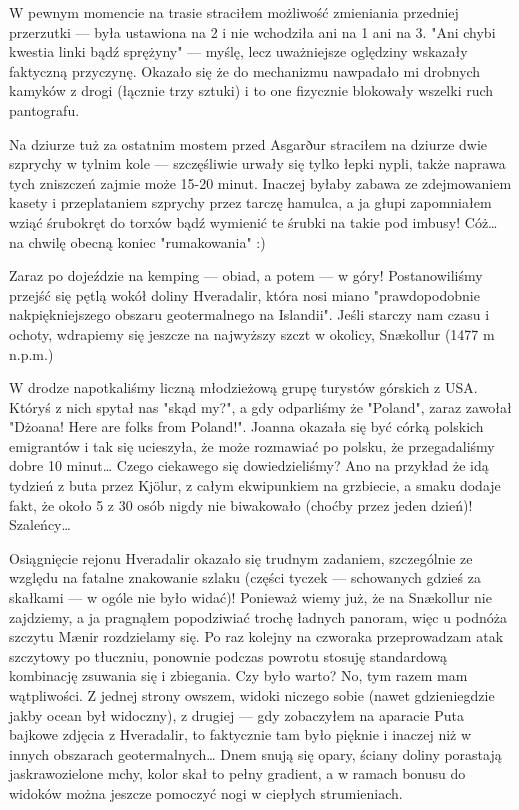W pewnym momencie na trasie straciłem możliwość zmieniania przedniej przerzutki --- była ustawiona na 2 i nie wchodziła ani na 1 ani na 3. "Ani chybi kwestia linki bądź sprężyny" --- myślę, lecz uważniejsze oględziny wskazały faktyczną przyczynę. Okazało się że do mechanizmu nawpadało mi drobnych kamyków z drogi (łącznie trzy sztuki) i to one fizycznie blokowały wszelki ruch pantografu.

Na dziurze tuż za ostatnim mostem przed Asgarður straciłem na dziurze dwie szprychy w tylnim kole --- szczęśliwie urwały się tylko łepki nypli, także naprawa tych zniszczeń zajmie może 15-20 minut. Inaczej byłaby zabawa ze zdejmowaniem kasety i przeplataniem szprychy przez tarczę hamulca, a ja głupi zapomniałem wziąć śrubokręt do torxów bądź wymienić te śrubki na takie pod imbusy! Cóż… na chwilę obecną koniec "rumakowania" :)


Zaraz po dojeździe na kemping --- obiad, a potem --- w góry! Postanowiliśmy przejść się pętlą wokół doliny Hveradalir, która nosi miano "prawdopodobnie nakpiękniejszego obszaru geotermalnego na Islandii". Jeśli starczy nam czasu i ochoty, wdrapiemy się jeszcze na najwyższy szczt w okolicy, Snækollur (1477 m n.p.m.)

W drodze napotkaliśmy liczną młodzieżową grupę turystów górskich z USA. Któryś z nich spytał nas "skąd my?", a gdy odparliśmy że "Poland", zaraz zawołał "Dżoana! Here are folks from Poland!". Joanna okazała się być córką polskich emigrantów i tak się ucieszyła, że może rozmawiać po polsku, że przegadaliśmy dobre 10 minut… Czego ciekawego się dowiedzieliśmy? Ano na przykład że idą tydzień z buta przez Kjölur, z całym ekwipunkiem na grzbiecie, a smaku dodaje fakt, że około 5 z 30 osób nigdy nie biwakowało (choćby przez jeden dzień)! Szaleńcy…


Osiągnięcie rejonu Hveradalir okazało się trudnym zadaniem, szczególnie ze względu na fatalne znakowanie szlaku (części tyczek --- schowanych gdzieś za skałkami --- w ogóle nie było widać)! Ponieważ wiemy już, że na Snækollur nie zajdziemy, a ja pragnąłem popodziwiać trochę ładnych panoram, więc u podnóża szczytu Mænir rozdzielamy się. Po raz kolejny na czworaka przeprowadzam atak szczytowy po tłuczniu, ponownie podczas powrotu stosuję standardową kombinację zsuwania się i zbiegania. Czy było warto? No, tym razem mam wątpliwości. Z jednej strony owszem, widoki niczego sobie (nawet gdzieniegdzie jakby ocean był widoczny), z drugiej --- gdy zobaczyłem na aparacie Puta bajkowe zdjęcia z Hveradalir, to faktycznie tam było pięknie i inaczej niż w innych obszarach geotermalnych… Dnem snują się opary, ściany doliny porastają jaskrawozielone mchy, kolor skał to pełny gradient, a w ramach bonusu do widoków można jeszcze pomoczyć nogi w ciepłych strumieniach.

